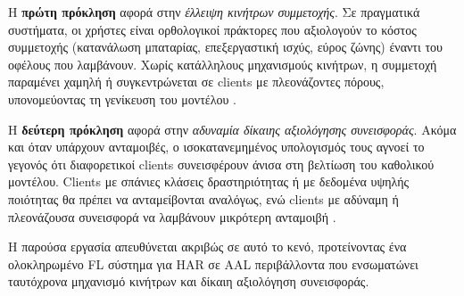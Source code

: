 Η \textbf{πρώτη πρόκληση} αφορά στην \textit{έλλειψη κινήτρων συμμετοχής}.
Σε πραγματικά συστήματα, οι χρήστες είναι ορθολογικοί πράκτορες που
αξιολογούν το κόστος συμμετοχής (κατανάλωση μπαταρίας, επεξεργαστική
ισχύς, εύρος ζώνης) έναντι του οφέλους που λαμβάνουν. Χωρίς κατάλληλους
μηχανισμούς κινήτρων, η συμμετοχή παραμένει χαμηλή ή συγκεντρώνεται σε
clients με πλεονάζοντες πόρους, υπονομεύοντας τη γενίκευση του μοντέλου
\cite{Kang2019}.

Η \textbf{δεύτερη πρόκληση} αφορά στην \textit{αδυναμία δίκαιης αξιολόγησης
συνεισφοράς}. Ακόμα και όταν υπάρχουν ανταμοιβές, ο ισοκατανεμημένος
υπολογισμός τους αγνοεί το γεγονός ότι διαφορετικοί clients συνεισφέρουν
άνισα στη βελτίωση του καθολικού μοντέλου. Clients με σπάνιες κλάσεις
δραστηριότητας ή με δεδομένα υψηλής ποιότητας θα πρέπει να ανταμείβονται
αναλόγως, ενώ clients με αδύναμη ή πλεονάζουσα συνεισφορά να λαμβάνουν
μικρότερη ανταμοιβή \cite{Wang2019}.

Η παρούσα εργασία απευθύνεται ακριβώς σε αυτό το κενό, προτείνοντας ένα
ολοκληρωμένο FL σύστημα για HAR σε AAL περιβάλλοντα που ενσωματώνει
ταυτόχρονα μηχανισμό κινήτρων και δίκαιη αξιολόγηση συνεισφοράς.
